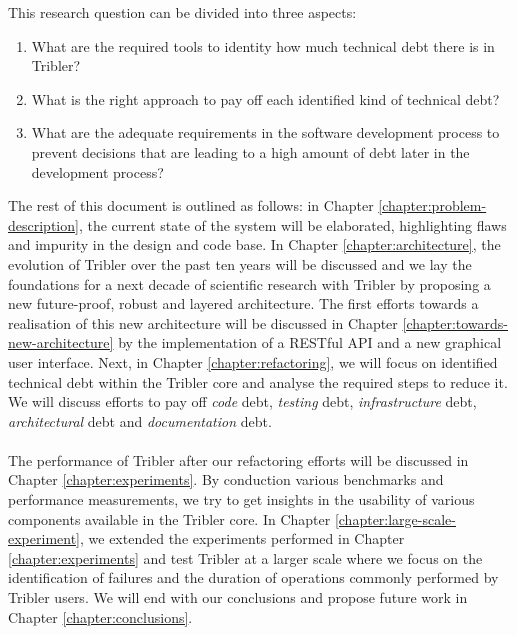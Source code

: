This research question can be divided into three aspects:
\begin{enumerate}
	\item What are the required tools to identity how much technical debt there is in Tribler?
	\item What is the right approach to pay off each identified kind of technical debt?
	\item What are the adequate requirements in the software development process to prevent decisions that are leading to a high amount of debt later in the development process?
\end{enumerate}
The rest of this document is outlined as follows: in Chapter \ref{chapter:problem-description}, the current state of the system will be elaborated, highlighting flaws and impurity in the design and code base. 
In Chapter \ref{chapter:architecture}, the evolution of Tribler over the past ten years will be discussed and we lay the foundations for a next decade of scientific research with Tribler by proposing a new future-proof, robust and layered architecture.
The first efforts towards a realisation of this new architecture will be discussed in Chapter \ref{chapter:towards-new-architecture} by the implementation of a RESTful API and a new graphical user interface.
Next, in Chapter \ref{chapter:refactoring}, we will focus on identified technical debt within the Tribler core and analyse the required steps to reduce it. 
We will discuss efforts to pay off \emph{code} debt, \emph{testing} debt, \emph{infrastructure} debt, \emph{architectural} debt and \emph{documentation} debt.\\\\
The performance of Tribler after our refactoring efforts will be discussed in Chapter \ref{chapter:experiments}.
By conduction various benchmarks and performance measurements, we try to get insights in the usability of various components available in the Tribler core.
In Chapter \ref{chapter:large-scale-experiment}, we extended the experiments performed in Chapter \ref{chapter:experiments} and test Tribler at a larger scale where we focus on the identification of failures and the duration of operations commonly performed by Tribler users.
We will end with our conclusions and propose future work in Chapter \ref{chapter:conclusions}.
